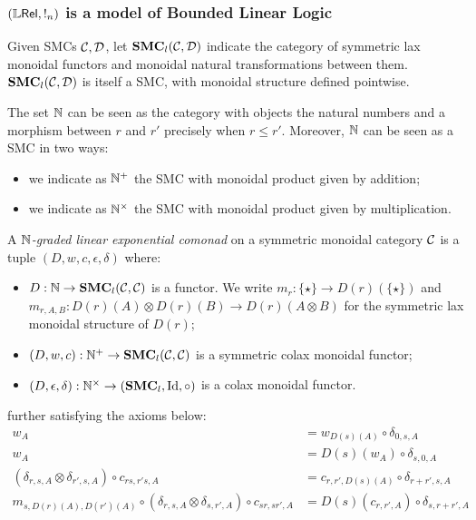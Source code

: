 \subsubsection{$(\mathbb{L} \mathsf{Rel}, !_{n})$ is a model of Bounded Linear Logic}

Given SMCs $\mathcal{C},\mathcal{D}$,  let $\mathbf{SMC}_{l}(\mathcal{C}, \mathcal{D})$ indicate the category of symmetric lax monoidal functors and monoidal natural transformations between them.
$\mathbf{SMC}_{l}(\mathcal{C}, \mathcal{D})$  is itself a SMC, with monoidal structure defined pointwise.

The set 
$\mathbb{N}$ can be seen as the category with objects the natural numbers and a morphism between $r$ and $r'$ precisely when $r\leq r'$. 
Moreover, $\mathbb{N}$ can be seen as a SMC in two ways:
\begin{itemize}

\item we indicate as $\mathbb{N}^{+}$ the SMC with monoidal product given by addition;
\item we indicate as $\mathbb{N}^{\times}$ the SMC with monoidal product given by multiplication.
\end{itemize}



\begin{definition}
A \emph{$\mathbb{N}$-graded linear exponential comonad} on a symmetric monoidal category $\mathcal{C}$ is a tuple
$(D, w,c,\epsilon,\delta)$ where:
\begin{itemize}

\item $D: \mathbb{N}\to \mathbf{SMC}_{l}(\mathcal{C}, \mathcal{C})$ is a functor. We write 
$m_{r}:\{\star\} \to D(r)(\{\star\})$ and $m_{r,A,B}: D(r)(A)\otimes D(r)(B) \to D(r)(A\otimes B)$ for the symmetric lax monoidal structure of $D(r)$;

\item $(D,w,c): \mathbb{N}^{+}\to \mathbf{SMC}_{l}(\mathcal{C}, \mathcal{C})$ is a symmetric colax monoidal functor;

\item $(D,\epsilon,\delta):\mathbb{N}^{\times}\to (\mathbf{SMC}_{l},\mathrm{Id},\circ) $ is a colax monoidal functor.



\end{itemize}
further satisfying the axioms below:
\begin{align}
w_{A}& =  w_{D(s)(A)}\circ \delta_{0,s,A}\\
w_{A} & = D(s)(w_{A} )\circ \delta_{s,0,A} \\
(\delta_{r,s,A}\otimes \delta_{r',s,A})\circ c_{rs,r's,A}
&=
c_{r,r',D(s)(A)}\circ \delta_{r+r',s,A}\\
m_{s,D(r)(A),D(r')(A)}\circ (\delta_{r,s,A}\otimes \delta_{s,r',A})\circ c_{sr,sr',A}&=
D(s)(c_{r,r',A})\circ \delta_{s,r+r',A}
\end{align}
\end{definition}


